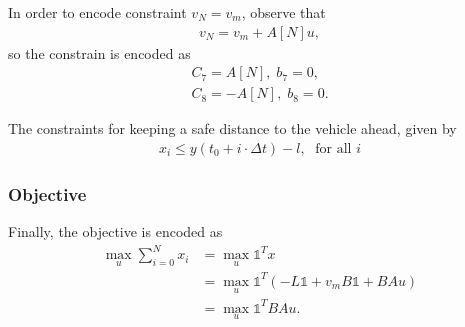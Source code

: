 \documentclass[a4paper]{article}
\theoremstyle{definition}
\theoremstyle{plain}
\begin{document}
In order to encode constraint $v_{N} = v_{m}$, observe that
\begin{align*}
  v_{N} = v_{m} + A[N] u ,
\end{align*}
so the constrain is encoded as
\begin{align*}
  C_{7} = A[N], \; b_{7} = 0 , \\
  C_{8} = -A[N], \; b_{8} = 0 .
\end{align*}

The constraints for keeping a safe distance to the vehicle ahead, given by
\begin{align*}
  x_{i} \leq y(t_{0} + i \cdot \Delta t) - l , \; \text{ for all } i
\end{align*}

\subsubsection*{Objective}

Finally, the objective is encoded as
\begin{align*}
  \max_{u} \sum_{i=0}^{N} x_{i} &= \max_{u} \mathds{1}^{T} x \\
  &= \max_{u} \mathds{1}^{T} (-L \mathds{1} + v_{m}B \mathds{1}  + BAu) \\
  &= \max_{u} \mathds{1}^{T} BA u .
\end{align*}
\end{document}
